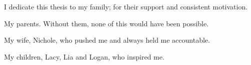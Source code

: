 \label{ackChapter}
I dedicate this thesis to my family; for their support and consistent motivation.\par
My parents. Without them, none of this would have been possible.\par
My wife, Nichole, who pushed me and always held me accountable.\par
My children, Lacy, Lia and Logan, who inspired me.\par
